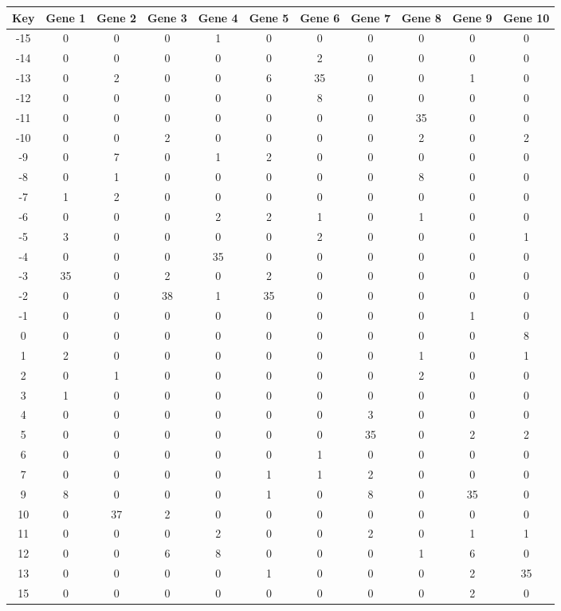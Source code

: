\begin{tabular}{|c|c|c|c|c|c|c|c|c|c|c|}
\hline
Key & Gene 1 & Gene 2 & Gene 3 & Gene 4 & Gene 5 & Gene 6 & Gene 7 & Gene 8 & Gene 9 & Gene 10 \\
\hline
-15 & 0 & 0 & 0 & 1 & 0 & 0 & 0 & 0 & 0 & 0 \\
-14 & 0 & 0 & 0 & 0 & 0 & 2 & 0 & 0 & 0 & 0 \\
-13 & 0 & 2 & 0 & 0 & 6 & 35 & 0 & 0 & 1 & 0 \\
-12 & 0 & 0 & 0 & 0 & 0 & 8 & 0 & 0 & 0 & 0 \\
-11 & 0 & 0 & 0 & 0 & 0 & 0 & 0 & 35 & 0 & 0 \\
-10 & 0 & 0 & 2 & 0 & 0 & 0 & 0 & 2 & 0 & 2 \\
-9 & 0 & 7 & 0 & 1 & 2 & 0 & 0 & 0 & 0 & 0 \\
-8 & 0 & 1 & 0 & 0 & 0 & 0 & 0 & 8 & 0 & 0 \\
-7 & 1 & 2 & 0 & 0 & 0 & 0 & 0 & 0 & 0 & 0 \\
-6 & 0 & 0 & 0 & 2 & 2 & 1 & 0 & 1 & 0 & 0 \\
-5 & 3 & 0 & 0 & 0 & 0 & 2 & 0 & 0 & 0 & 1 \\
-4 & 0 & 0 & 0 & 35 & 0 & 0 & 0 & 0 & 0 & 0 \\
-3 & 35 & 0 & 2 & 0 & 2 & 0 & 0 & 0 & 0 & 0 \\
-2 & 0 & 0 & 38 & 1 & 35 & 0 & 0 & 0 & 0 & 0 \\
-1 & 0 & 0 & 0 & 0 & 0 & 0 & 0 & 0 & 1 & 0 \\
0 & 0 & 0 & 0 & 0 & 0 & 0 & 0 & 0 & 0 & 8 \\
1 & 2 & 0 & 0 & 0 & 0 & 0 & 0 & 1 & 0 & 1 \\
2 & 0 & 1 & 0 & 0 & 0 & 0 & 0 & 2 & 0 & 0 \\
3 & 1 & 0 & 0 & 0 & 0 & 0 & 0 & 0 & 0 & 0 \\
4 & 0 & 0 & 0 & 0 & 0 & 0 & 3 & 0 & 0 & 0 \\
5 & 0 & 0 & 0 & 0 & 0 & 0 & 35 & 0 & 2 & 2 \\
6 & 0 & 0 & 0 & 0 & 0 & 1 & 0 & 0 & 0 & 0 \\
7 & 0 & 0 & 0 & 0 & 1 & 1 & 2 & 0 & 0 & 0 \\
9 & 8 & 0 & 0 & 0 & 1 & 0 & 8 & 0 & 35 & 0 \\
10 & 0 & 37 & 2 & 0 & 0 & 0 & 0 & 0 & 0 & 0 \\
11 & 0 & 0 & 0 & 2 & 0 & 0 & 2 & 0 & 1 & 1 \\
12 & 0 & 0 & 6 & 8 & 0 & 0 & 0 & 1 & 6 & 0 \\
13 & 0 & 0 & 0 & 0 & 1 & 0 & 0 & 0 & 2 & 35 \\
15 & 0 & 0 & 0 & 0 & 0 & 0 & 0 & 0 & 2 & 0 \\
\hline
\end{tabular}